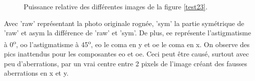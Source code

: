 \documentclass[11pt,letterpaper]{article}
\begin{document}
\begin{figure}[H]
    \centering
{}

\caption{Puissance relative des différentes images de la figure \ref{test23}.}
\label{fig4}
\end{figure}
Avec 'raw' représentant la photo originale rognée, 'sym' la partie symétrique de 'raw' et asym la différence de 'raw' et 'sym'. De plus, ee représente l'astigmatisme à 0\textsuperscript{o}, oo l'astigmatisme à 45\textsuperscript{o}, eo le coma en y et oe le coma en x. On observe des pics inattendus pour les composantes eo et oe. Ceci peut être causé, surtout avec peu d'aberrations, par un vrai centre entre 2 pixels de l'image créant des fausses aberrations en x et y.
\end{document}
